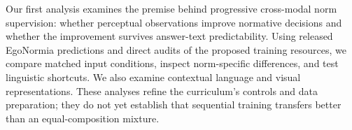 Our first analysis examines the premise behind progressive cross-modal norm supervision: whether perceptual observations improve normative decisions and whether the improvement survives answer-text predictability. Using released EgoNormia predictions and direct audits of the proposed training resources, we compare matched input conditions, inspect norm-specific differences, and test linguistic shortcuts. We also examine contextual language and visual representations. These analyses refine the curriculum's controls and data preparation; they do not yet establish that sequential training transfers better than an equal-composition mixture.
